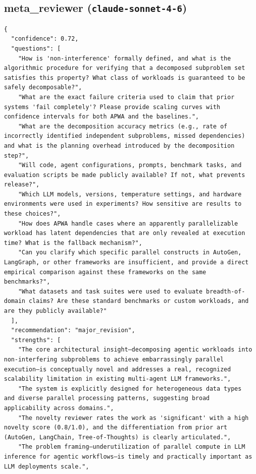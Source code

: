 \documentclass[11pt]{article}
\begin{document}
\subsection*{meta_reviewer (\texttt{claude-sonnet-4-6})}
\begin{verbatim}
{
  "confidence": 0.72,
  "questions": [
    "How is 'non-interference' formally defined, and what is the algorithmic procedure for verifying that a decomposed subproblem set satisfies this property? What class of workloads is guaranteed to be safely decomposable?",
    "What are the exact failure criteria used to claim that prior systems 'fail completely'? Please provide scaling curves with confidence intervals for both APWA and the baselines.",
    "What are the decomposition accuracy metrics (e.g., rate of incorrectly identified independent subproblems, missed dependencies) and what is the planning overhead introduced by the decomposition step?",
    "Will code, agent configurations, prompts, benchmark tasks, and evaluation scripts be made publicly available? If not, what prevents release?",
    "Which LLM models, versions, temperature settings, and hardware environments were used in experiments? How sensitive are results to these choices?",
    "How does APWA handle cases where an apparently parallelizable workload has latent dependencies that are only revealed at execution time? What is the fallback mechanism?",
    "Can you clarify which specific parallel constructs in AutoGen, LangGraph, or other frameworks are insufficient, and provide a direct empirical comparison against these frameworks on the same benchmarks?",
    "What datasets and task suites were used to evaluate breadth-of-domain claims? Are these standard benchmarks or custom workloads, and are they publicly available?"
  ],
  "recommendation": "major_revision",
  "strengths": [
    "The core architectural insight—decomposing agentic workloads into non-interfering subproblems to achieve embarrassingly parallel execution—is conceptually novel and addresses a real, recognized scalability limitation in existing multi-agent LLM frameworks.",
    "The system is explicitly designed for heterogeneous data types and diverse parallel processing patterns, suggesting broad applicability across domains.",
    "The novelty reviewer rates the work as 'significant' with a high novelty score (0.8/1.0), and the differentiation from prior art (AutoGen, LangChain, Tree-of-Thoughts) is clearly articulated.",
    "The problem framing—underutilization of parallel compute in LLM inference for agentic workflows—is timely and practically important as LLM deployments scale.",

\end{verbatim}
\end{document}
